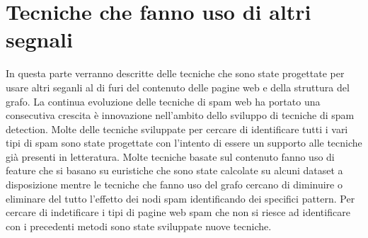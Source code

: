 \chapter{Tecniche che fanno uso di altri segnali}
In questa parte verranno descritte delle tecniche che sono state progettate per usare altri seganli al di furi del contenuto delle pagine web e della struttura del grafo. La continua evoluzione delle tecniche di spam web ha portato una consecutiva crescita è innovazione nell'ambito dello sviluppo di tecniche di spam detection. Molte delle tecniche sviluppate per cercare di identificare tutti i vari tipi di spam sono state progettate con l'intento di essere un supporto alle tecniche già presenti in letteratura. Molte tecniche basate sul contenuto fanno uso di feature che si basano su euristiche che sono state calcolate su alcuni dataset a disposizione mentre le tecniche che fanno uso del grafo cercano di diminuire o eliminare del tutto l'effetto dei nodi spam identificando dei specifici pattern. Per cercare di indetificare i tipi di pagine web spam che non si riesce ad identificare con i precedenti metodi sono state sviluppate nuove tecniche.


